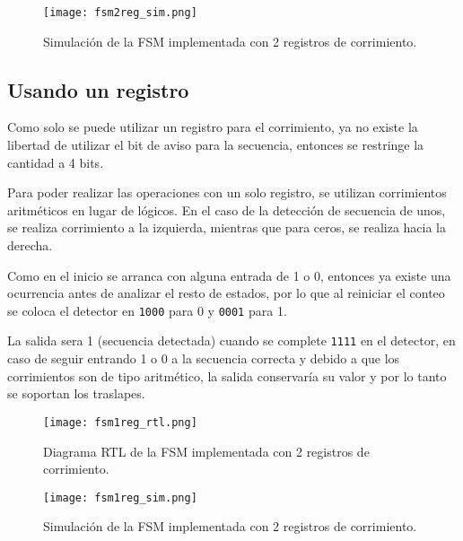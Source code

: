 	\begin{figure}[ht]
		\centering
		\texttt{[image: fsm2reg\_sim.png]}
		\caption{
			Simulación de la FSM implementada con 2 registros de corrimiento.
			\label{fig:fsm2reg_sim}
		}
	\end{figure}


\enter


\subsection{Usando un registro}
	Como solo se puede utilizar un registro para el corrimiento, ya no existe la libertad de utilizar el bit de aviso para la secuencia, entonces se restringe la cantidad a 4 bits.
	
	\enter
	
	Para poder realizar las operaciones con un solo registro, se utilizan corrimientos aritméticos en lugar de lógicos. 
	En el caso de la detección de secuencia de unos, se realiza corrimiento a la 
	izquierda, mientras que para ceros, se realiza hacia la derecha.
	
	\enter
	
	Como en el inicio se arranca con alguna entrada de 1 o 0, entonces ya existe una ocurrencia antes de analizar el resto de estados, por lo que al reiniciar el conteo se coloca el detector en \texttt{1000} para 0 y \texttt{0001} para 1.
	
	\enter
	
	La salida sera 1 (secuencia detectada) cuando se complete \texttt{1111} en 
	el detector, en caso de seguir entrando 1 o 0 a la secuencia correcta y debido a que los corrimientos son de tipo aritmético, la salida conservaría su valor y por lo tanto se soportan los traslapes.
	
	\begin{figure}[ht]
		\centering
		\texttt{[image: fsm1reg\_rtl.png]}
		\caption{
			Diagrama RTL de la FSM implementada con 2 registros de corrimiento.
			\label{fig:fsm1reg_rtl}
		}
	\end{figure}
	
	\begin{figure}[ht]
		\centering
		\texttt{[image: fsm1reg\_sim.png]}
		\caption{
			Simulación de la FSM implementada con 2 registros de corrimiento.
			\label{fig:fsm1reg_sim}
		}
	\end{figure}
	
	
	
	
	
	
	
	
	
